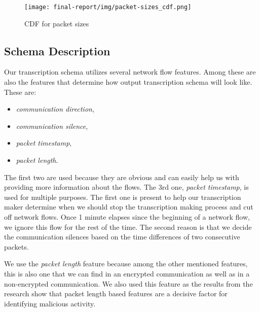 \documentclass{article}
\begin{document}
\begin{figure}[h!]
    \centering
    \texttt{[image: final-report/img/packet-sizes\_cdf.png]}
    \caption{CDF for packet sizes}
    \label{fig-cdf-packet-sizes}
\end{figure}



\subsection{Schema Description}\label{sec-schema}
Our transcription schema utilizes several network flow features. Among these are also the features that determine how output transcription schema will look like. These are:

\begin{itemize}
    \item \textit{communication direction},
    \item \textit{communication silence},
    \item \textit{packet timestamp},
    \item \textit{packet length}.
\end{itemize}

The first two are used because they are obvious and can easily help us with providing more information about the flows. The 3rd one, \textit{packet timestamp}, is used for multiple purposes. The first one is present to help our transcription maker determine when we should stop the transcription making process and cut off network flows. Once 1 minute elapses since the beginning of a network flow, we ignore this flow for the rest of the time. The second reason is that we decide the communication silences based on the time differences of two consecutive packets.

We use the \textit{packet length} feature because among the other mentioned features, this is also one that we can find in an encrypted communication as well as in a non-encrypted communication. We also used this feature as the results from the research \cite{meghdouri2018analysis} show that packet length based features are a decisive factor for identifying malicious activity.

\end{document}
